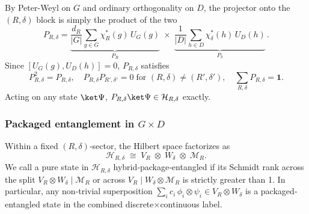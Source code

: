 \documentclass[12pt,a4paper]{article}
\begin{document}
By Peter-Weyl on $G$ and ordinary orthogonality on $D$, the projector onto the $(R,\delta)$ block is simply the product of the two
\[
P_{R,\delta}
=\underbrace{\frac{d_R}{|G|}\sum_{g\in G}\chi_R^*(g)\,U_G(g)}_{P_R}
\;\times\;
\underbrace{\frac{1}{|D|}\sum_{h\in D}\chi_\delta^*(h)\,U_D(h)}_{P_\delta}\,.
\]
Since $[U_G(g),U_D(h)]=0$, $P_{R,\delta}$ satisfies
\[
P_{R,\delta}^2=P_{R,\delta},
\quad
P_{R,\delta}P_{R',\delta'}=0\;\text{for }(R,\delta)\neq(R',\delta'),
\quad
\sum_{R,\delta}P_{R,\delta}=\mathbf1.
\]
Acting on any state $\ket\Psi$, $P_{R,\delta}\ket\Psi\in\mathcal H_{R,\delta}$ exactly.



\subsubsection{Packaged entanglement in $G\times D$}
\label{sec:GD-entanglement}

Within a fixed $(R,\delta)$‐sector, the Hilbert space factorizes as
\[
\mathcal H_{R,\delta}
\;\cong\;
V_R\;\otimes\;W_\delta\;\otimes\;\mathcal M_R.
\]
We call a pure state in $\mathcal H_{R,\delta}$ hybrid‐package‐entangled if its Schmidt rank across the split 
$
V_R\otimes W_\delta\;\big|\;\mathcal M_R
$
or across 
$
V_R\;\big|\;W_\delta\otimes\mathcal M_R
$
is strictly greater than 1.
In particular, any non‐trivial superposition
$
\sum_i c_i\,\phi_i\otimes\psi_i
\in V_R\otimes W_\delta
$
is a packaged‐entangled state in the combined discrete×continuous label.
\end{document}
